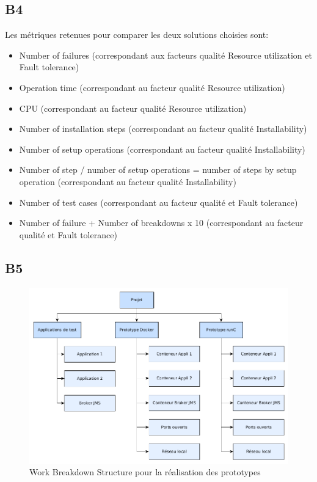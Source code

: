 \subsection*{B4}
    Les métriques retenues pour comparer les deux solutions choisies sont:
    \begin{itemize}
        \item Number of failures (correspondant aux facteurs qualité Resource utilization et Fault tolerance)
        \item Operation time (correspondant au facteur qualité Resource utilization)
        \item CPU (correspondant au facteur qualité Resource utilization)
        \item Number of installation steps (correspondant au facteur qualité Installability)
        \item Number of setup operations (correspondant au facteur qualité Installability)
        \item Number of step / number of setup operations = number of steps by setup operation (correspondant au facteur qualité Installability)
        \item Number of test cases (correspondant au facteur qualité et Fault tolerance)
        \item Number of failure + Number of breakdowns x 10 (correspondant au facteur qualité et Fault tolerance)
    \end{itemize}

\subsection*{B5}

    \begin{figure}[H]
            \centering
            \includegraphics[width=\textwidth]{images/WBS.png}
            \caption{Work Breakdown Structure pour la réalisation des prototypes}
            \label{fig:wbs}
    \end{figure}
